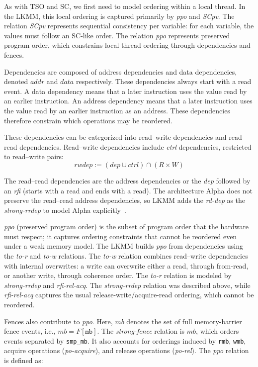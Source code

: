 As with TSO and SC, we first need to model ordering within a local thread. In the LKMM, this local ordering is captured primarily by \textit{ppo} and \textit{SCpv}. The relation \textit{SCpv} represents sequential consistency per variable: for each variable, the values must follow an SC-like order. The relation \textit{ppo} represents preserved program order, which constrains local-thread ordering through dependencies and fences.

Dependencies are composed of address dependencies and data dependencies, denoted $\mathit{addr}$ and $\mathit{data}$ respectively. These dependencies always start with a read event. A data dependency means that a later instruction uses the value read by an earlier instruction. An address dependency means that a later instruction uses the value read by an earlier instruction as an address. These dependencies therefore constrain which operations may be reordered.

These dependencies can be categorized into read--write dependencies and read--read dependencies. Read--write dependencies include \textit{ctrl} dependencies, restricted to read--write pairs:
\[
\mathit{rwdep} := (\mathit{dep} \cup \mathit{ctrl}) \cap (R \times W)
\]

The read--read dependencies are the address dependencies or the \textit{dep} followed by an \textit{rfi} (starts with a read and ends with a read). The architecture Alpha does not preserve the read--read address dependencies, so LKMM adds the \textit{rd-dep} as the \textit{strong-rrdep} to model Alpha explicitly~\citep{alglave2018frightening}.

\textit{ppo} (preserved program order) is the subset of program order that the hardware must respect; it captures ordering constraints that cannot be reordered even under a weak memory model. The LKMM builds \textit{ppo} from dependencies using the \textit{to-r} and \textit{to-w} relations. The \textit{to-w} relation combines read--write dependencies with internal overwrites: a write can overwrite either a read, through from-read, or another write, through coherence order. The \textit{to-r} relation is modeled by \textit{strong-rrdep} and \textit{rfi-rel-acq}. The \textit{strong-rrdep} relation was described above, while \textit{rfi-rel-acq} captures the usual release-write/acquire-read ordering, which cannot be reordered.

Fences also contribute to \textit{ppo}. Here, $\mathit{mb}$ denotes the set of full memory-barrier fence events, i.e., $\mathit{mb} = F[\texttt{mb}]$. The \textit{strong-fence} relation is $\mathit{mb}$, which orders events separated by \texttt{smp\_mb}. It also accounts for orderings induced by \texttt{rmb}, \texttt{wmb}, acquire operations (\textit{po-acquire}), and release operations (\textit{po-rel}). The \textit{ppo} relation is defined as:

